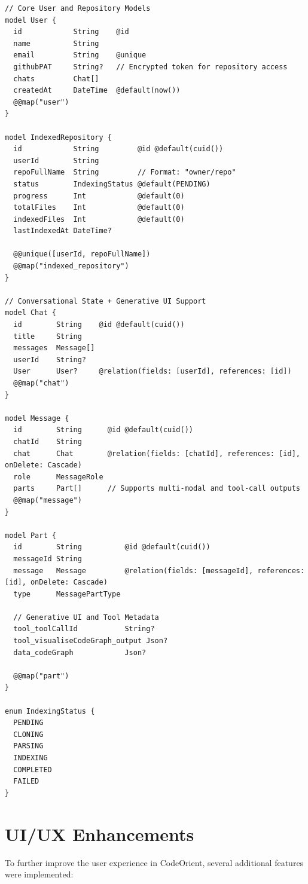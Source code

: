 \begin{verbatim}
// Core User and Repository Models
model User {
  id            String    @id
  name          String
  email         String    @unique
  githubPAT     String?   // Encrypted token for repository access
  chats         Chat[]
  createdAt     DateTime  @default(now())
  @@map("user")
}

model IndexedRepository {
  id            String         @id @default(cuid())
  userId        String
  repoFullName  String         // Format: "owner/repo"
  status        IndexingStatus @default(PENDING)
  progress      Int            @default(0)
  totalFiles    Int            @default(0)
  indexedFiles  Int            @default(0)
  lastIndexedAt DateTime?
  
  @@unique([userId, repoFullName])
  @@map("indexed_repository")
}

// Conversational State + Generative UI Support
model Chat {
  id        String    @id @default(cuid())
  title     String
  messages  Message[]
  userId    String?
  User      User?     @relation(fields: [userId], references: [id])
  @@map("chat")
}

model Message {
  id        String      @id @default(cuid())
  chatId    String
  chat      Chat        @relation(fields: [chatId], references: [id], onDelete: Cascade)
  role      MessageRole
  parts     Part[]      // Supports multi-modal and tool-call outputs
  @@map("message")
}

model Part {
  id        String          @id @default(cuid())
  messageId String
  message   Message         @relation(fields: [messageId], references: [id], onDelete: Cascade)
  type      MessagePartType
  
  // Generative UI and Tool Metadata
  tool_toolCallId           String?
  tool_visualiseCodeGraph_output Json?
  data_codeGraph            Json?
  
  @@map("part")
}

enum IndexingStatus {
  PENDING
  CLONING
  PARSING
  INDEXING
  COMPLETED
  FAILED
}
\end{verbatim}
\begin{center}
    \label{lst:database_schema}
\end{center}

\section{UI/UX Enhancements}
To further improve the user experience in CodeOrient, several additional features were implemented:
